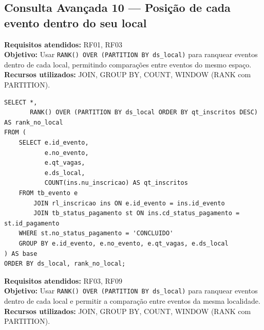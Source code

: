\documentclass[12pt,a4paper]{article}
\begin{document}
\subsection{Consulta Avançada 10 --- Posição de cada evento dentro do seu local}
\textbf{Requisitos atendidos:} RF01, RF03 \\
\textbf{Objetivo:} Usar \texttt{RANK() OVER (PARTITION BY ds\_local)} para ranquear eventos dentro de cada local, permitindo comparações entre eventos do mesmo espaço. \\
\textbf{Recursos utilizados:} JOIN, GROUP BY, COUNT, WINDOW (RANK com PARTITION).
\begin{lstlisting}[caption={QA10 --- Posição de cada evento dentro do seu local.}]
SELECT *,
       RANK() OVER (PARTITION BY ds_local ORDER BY qt_inscritos DESC) AS rank_no_local
FROM (
    SELECT e.id_evento,
           e.no_evento,
           e.qt_vagas,
           e.ds_local,
           COUNT(ins.nu_inscricao) AS qt_inscritos
    FROM tb_evento e
        JOIN rl_inscricao ins ON e.id_evento = ins.id_evento
        JOIN tb_status_pagamento st ON ins.cd_status_pagamento = st.id_pagamento
    WHERE st.no_status_pagamento = 'CONCLUIDO'
    GROUP BY e.id_evento, e.no_evento, e.qt_vagas, e.ds_local
) AS base
ORDER BY ds_local, rank_no_local;
\end{lstlisting}
\textbf{Requisitos atendidos:} RF03, RF09 \\
\textbf{Objetivo:} Usar \texttt{RANK() OVER (PARTITION BY ds\_local)} para ranquear eventos dentro de cada local e permitir a comparação entre eventos da mesma localidade. \\
\textbf{Recursos utilizados:} JOIN, GROUP BY, COUNT, WINDOW (RANK com PARTITION).
\end{document}
